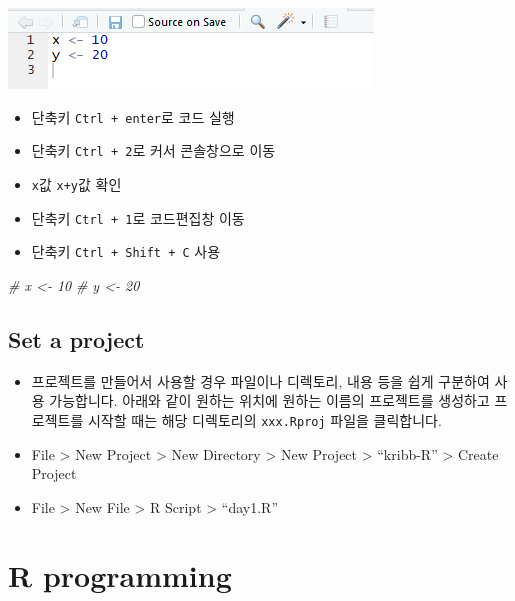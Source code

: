 \documentclass[
]{book}
\newenvironment{Shaded}{\begin{snugshade}}{\end{snugshade}}
\newcommand{\CommentTok}[1]{\textcolor[rgb]{0.56,0.35,0.01}{\textit{#1}}}
\providecommand{\tightlist}{%
  \setlength{\itemsep}{0pt}\setlength{\parskip}{0pt}}
\begin{document}
\includegraphics{images/01/01-14.PNG}

\begin{itemize}
\tightlist
\item
  단축키 \texttt{Ctrl\ +\ enter}로 코드 실행
\item
  단축키 \texttt{Ctrl\ +\ 2}로 커서 콘솔창으로 이동
\item
  \texttt{x}값 \texttt{x+y}값 확인
\item
  단축키 \texttt{Ctrl\ +\ 1}로 코드편집창 이동
\item
  단축키 \texttt{Ctrl\ +\ Shift\ +\ C} 사용
\end{itemize}

\begin{Shaded}
\begin{Highlighting}[]
\CommentTok{\# x \textless{}{-} 10}
\CommentTok{\# y \textless{}{-} 20}
\end{Highlighting}
\end{Shaded}

\hypertarget{set-a-project}{%
\subsection{Set a project}\label{set-a-project}}

\begin{itemize}
\item
  프로젝트를 만들어서 사용할 경우 파일이나 디렉토리, 내용 등을 쉽게 구분하여 사용 가능합니다. 아래와 같이 원하는 위치에 원하는 이름의 프로젝트를 생성하고 프로젝트를 시작할 때는 해당 디렉토리의 \texttt{xxx.Rproj} 파일을 클릭합니다.
\item
  File \textgreater{} New Project \textgreater{} New Directory \textgreater{} New Project \textgreater{} ``kribb-R'' \textgreater{} Create Project
\item
  File \textgreater{} New File \textgreater{} R Script \textgreater{} ``day1.R''
\end{itemize}

\hypertarget{r-programming}{%
\section{R programming}\label{r-programming}}
\end{document}
